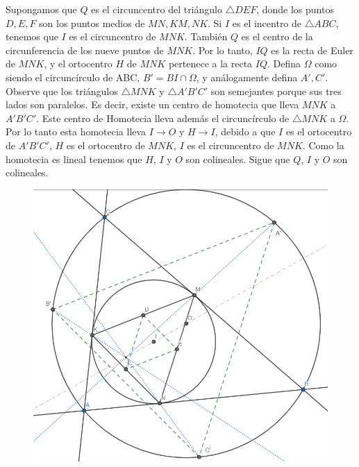 \begin{sol}
	Supongamos que $Q$ es el circuncentro del tri\'angulo $\triangle DEF$, donde los puntos $D, E, F$ son los puntos medios de $MN, KM, NK$. Si $I$ es el incentro de $\triangle ABC$, tenemos que $I$ es el circuncentro de $MNK$. Tambi\'en $Q$ es el centro de la circunferencia de los nueve puntos de $MNK$. Por lo tanto, $IQ$ es la recta de Euler de $MNK$, y el ortocentro $H$ de $MNK$ pertenece a la recta $IQ$. Defina $\Omega$ como siendo el circunc\'irculo de ABC, $B' = BI \cap \Omega$, y an\'alogamente defina $A', C'$. Observe que los tri\'angulos $\triangle MNK$ y $\triangle A'B'C'$ son semejantes porque sus tres lados son paralelos. Es decir, existe un centro de homotecia que lleva $MNK$ a $A'B'C'$. Este centro de Homotecia lleva adem\'as el circunc\'irculo de $\triangle MNK$ a $\Omega$. Por lo tanto esta homotecia lleva $I \to O$ y $H \to I$, debido a que $I$ es el ortocentro de $A'B'C'$, $H$ es el ortocentro de $MNK$, $I$ es el circuncentro de  $MNK$. Como la homotecia es lineal tenemos que $H$, $I$ y $O$ son colineales. Sigue que $Q$, $I$ y $O$ son colineales.
	
	\begin{figure}[h!] 
		\centering
		\includegraphics[scale=0.4]{Imgs/JT3.png}
	\end{figure}
\end{sol}